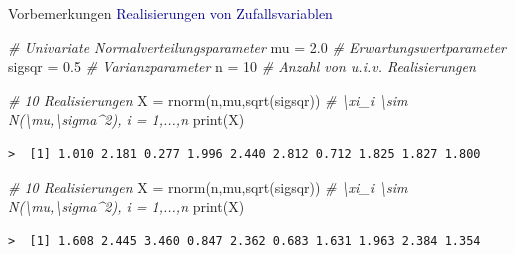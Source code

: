 \documentclass[
  8pt,
  ignorenonframetext,
]{beamer}
\newenvironment{Shaded}{\begin{snugshade}}{\end{snugshade}}
\newcommand{\CommentTok}[1]{\textcolor[rgb]{0.56,0.35,0.01}{\textit{#1}}}
\newcommand{\DecValTok}[1]{\textcolor[rgb]{0.00,0.00,0.81}{#1}}
\newcommand{\FloatTok}[1]{\textcolor[rgb]{0.00,0.00,0.81}{#1}}
\newcommand{\FunctionTok}[1]{\textcolor[rgb]{0.00,0.00,0.00}{#1}}
\newcommand{\NormalTok}[1]{#1}
\newcommand{\OtherTok}[1]{\textcolor[rgb]{0.56,0.35,0.01}{#1}}
\begin{document}
\begin{frame}[fragile]{Vorbemerkungen}
\protect\hypertarget{vorbemerkungen-2}{}
\textcolor{darkblue}{Realisierungen von Zufallsvariablen} \footnotesize
{} \vspace{2mm}

\begin{Shaded}
\begin{Highlighting}[]
\CommentTok{\# Univariate Normalverteilungsparameter}
\NormalTok{mu      }\OtherTok{=} \FloatTok{2.0}                        \CommentTok{\# Erwartungswertparameter}
\NormalTok{sigsqr  }\OtherTok{=} \FloatTok{0.5}                        \CommentTok{\# Varianzparameter}
\NormalTok{n       }\OtherTok{=} \DecValTok{10}                         \CommentTok{\# Anzahl von u.i.v. Realisierungen}

\CommentTok{\# 10 Realisierungen}
\NormalTok{X       }\OtherTok{=} \FunctionTok{rnorm}\NormalTok{(n,mu,}\FunctionTok{sqrt}\NormalTok{(sigsqr))   }\CommentTok{\# \textbackslash{}xi\_i \textbackslash{}sim N(\textbackslash{}mu,\textbackslash{}sigma\^{}2), i = 1,...,n}
\FunctionTok{print}\NormalTok{(X)}
\end{Highlighting}
\end{Shaded}

\begin{verbatim}
>  [1] 1.010 2.181 0.277 1.996 2.440 2.812 0.712 1.825 1.827 1.800
\end{verbatim}

\begin{Shaded}
\begin{Highlighting}[]
\CommentTok{\# 10 Realisierungen}
\NormalTok{X       }\OtherTok{=} \FunctionTok{rnorm}\NormalTok{(n,mu,}\FunctionTok{sqrt}\NormalTok{(sigsqr))   }\CommentTok{\# \textbackslash{}xi\_i \textbackslash{}sim N(\textbackslash{}mu,\textbackslash{}sigma\^{}2), i = 1,...,n}
\FunctionTok{print}\NormalTok{(X)}
\end{Highlighting}
\end{Shaded}

\begin{verbatim}
>  [1] 1.608 2.445 3.460 0.847 2.362 0.683 1.631 1.963 2.384 1.354
\end{verbatim}
\end{frame}
\end{document}
